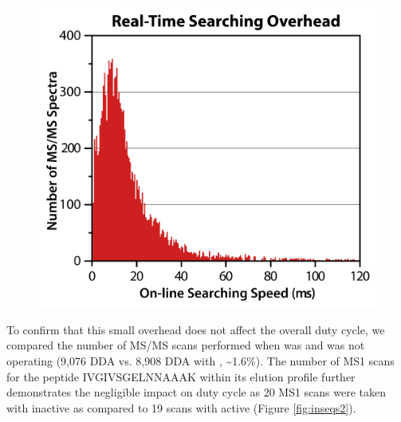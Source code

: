 \begin{figure}[p]
	\centering
	\includegraphics[width=\columnwidth]{inseq/inSeq_Fig S1.png}
	\label{fig:inseqs1}
\end{figure}
To confirm that this small overhead does not affect the overall duty cycle, we compared the number of MS/MS scans performed when \inseq{} was and was not operating (9,076 DDA vs. 8,908 DDA with \inseq{}, \textasciitilde1.6\%). The number of MS1 scans for the peptide IVGIVSGELNNAAAK within its elution profile further demonstrates the negligible impact on duty cycle as 20 MS1 scans were taken with \inseq{} inactive as compared to 19 scans with \inseq{} active (Figure \ref{fig:inseqs2}).
